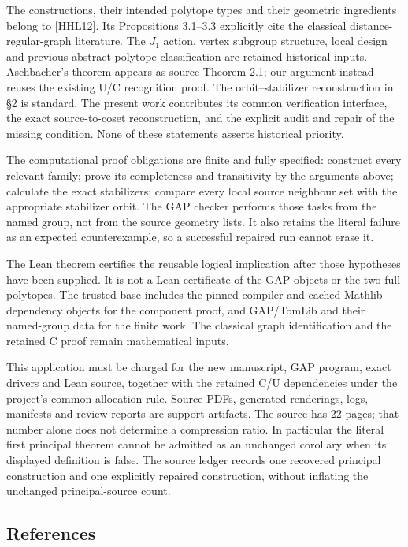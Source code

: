 \documentclass[
  11pt,
  a4paper,
]{article}
\begin{document}
The constructions, their intended polytope types and their geometric
ingredients belong to {[}HHL12{]}. Its Propositions 3.1--3.3 explicitly
cite the classical distance-regular-graph literature. The \(J_1\)
action, vertex subgroup structure, local design and previous
abstract-polytope classification are retained historical inputs.
Aschbacher's theorem appears as source Theorem 2.1; our argument instead
reuses the existing U/C recognition proof. The orbit--stabilizer
reconstruction in §2 is standard. The present work contributes its
common verification interface, the exact source-to-coset reconstruction,
and the explicit audit and repair of the missing condition. None of
these statements asserts historical priority.

The computational proof obligations are finite and fully specified:
construct every relevant family; prove its completeness and transitivity
by the arguments above; calculate the exact stabilizers; compare every
local source neighbour set with the appropriate stabilizer orbit. The
GAP checker performs those tasks from the named group, not from the
source geometry lists. It also retains the literal failure as an
expected counterexample, so a successful repaired run cannot erase it.

The Lean theorem certifies the reusable logical implication after those
hypotheses have been supplied. It is not a Lean certificate of the GAP
objects or the two full polytopes. The trusted base includes the pinned
compiler and cached Mathlib dependency objects for the component proof,
and GAP/TomLib and their named-group data for the finite work. The
classical graph identification and the retained C proof remain
mathematical inputs.

This application must be charged for the new manuscript, GAP program,
exact drivers and Lean source, together with the retained C/U
dependencies under the project's common allocation rule. Source PDFs,
generated renderings, logs, manifests and review reports are support
artifacts. The source has 22 pages; that number alone does not determine
a compression ratio. In particular the literal first principal theorem
cannot be admitted as an unchanged corollary when its displayed
definition is false. The source ledger records one recovered principal
construction and one explicitly repaired construction, without inflating
the unchanged principal-source count.

\subsection{References}\label{references}
\end{document}
